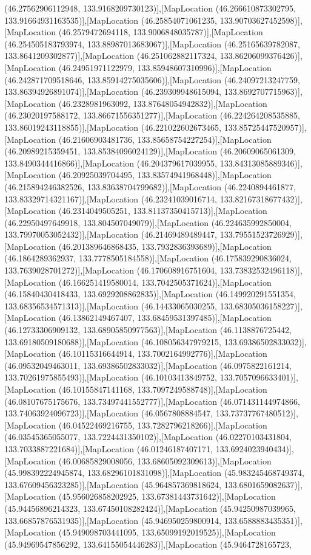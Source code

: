 (46.27562906112948, 133.9168209730123)],[MapLocation (46.266610873302795, 133.91664931163535)],[MapLocation (46.25854071061235, 133.90703627452598)],[MapLocation (46.2579472694118, 133.9006848035787)],[MapLocation (46.254505183793974, 133.88987013683067)],[MapLocation (46.25165639782087, 133.8641209302877)],[MapLocation (46.251062882117324, 133.86206099376426)],[MapLocation (46.24951971122979, 133.85948607310996)],[MapLocation (46.242871709518646, 133.85914275035606)],[MapLocation (46.24097213247759, 133.86394926891074)],[MapLocation (46.239309948615094, 133.8692707715963)],[MapLocation (46.2328981963092, 133.87648054942832)],[MapLocation (46.23020197588172, 133.86671556351277)],[MapLocation (46.224264208535885, 133.86019243118855)],[MapLocation (46.221022602673465, 133.85725447520957)],[MapLocation (46.21606903481736, 133.85658754227254)],[MapLocation (46.20989215359451, 133.85384096024129)],[MapLocation (46.20609065061309, 133.8490344416866)],[MapLocation (46.204379617039955, 133.84313085889346)],[MapLocation (46.20925039704495, 133.83574941968448)],[MapLocation (46.215894246382526, 133.83638704799682)],[MapLocation (46.2240894461877, 133.83329714321167)],[MapLocation (46.23241039016714, 133.82167318677432)],[MapLocation (46.2314049505251, 133.81137350415713)],[MapLocation (46.22950497649918, 133.804507049079)],[MapLocation (46.224635992850004, 133.79970053052432)],[MapLocation (46.21469489489447, 133.79551523726929)],[MapLocation (46.201389646868435, 133.7932836393689)],[MapLocation (46.1864289362937, 133.7778505184558)],[MapLocation (46.175839290836024, 133.7639028701272)],[MapLocation (46.170608916751604, 133.73832532496118)],[MapLocation (46.166251419580014, 133.7042505371624)],[MapLocation (46.15840430418433, 133.6929208862835)],[MapLocation (46.149920291551354, 133.68356534571313)],[MapLocation (46.14433065030255, 133.68305036158227)],[MapLocation (46.13862149467407, 133.68459531397485)],[MapLocation (46.12733306909132, 133.68905850977563)],[MapLocation (46.1138876725442, 133.69180509180688)],[MapLocation (46.108056347979215, 133.69386502833032)],[MapLocation (46.10115316644914, 133.7002164992776)],[MapLocation (46.09532049463011, 133.69386502833032)],[MapLocation (46.0975822161214, 133.70261975855493)],[MapLocation (46.10103413849752, 133.7057096633401)],[MapLocation (46.10155847141168, 133.7097249588748)],[MapLocation (46.08107675175676, 133.73497441552777)],[MapLocation (46.071431144974866, 133.74063924096723)],[MapLocation (46.0567808884547, 133.73737767480512)],[MapLocation (46.04522469216755, 133.7282796218266)],[MapLocation (46.03545365055077, 133.7224431350102)],[MapLocation (46.02270103431804, 133.7033887221684)],[MapLocation (46.01246187407171, 133.6924023940434)],[MapLocation (46.00685829008056, 133.68605092309613)],[MapLocation (45.998392224945874, 133.68296101831098)],[MapLocation (45.983245468749374, 133.67609456323285)],[MapLocation (45.964857369818624, 133.6801659082637)],[MapLocation (45.956026858202925, 133.67381443731642)],[MapLocation (45.94456896214323, 133.67450108282424)],[MapLocation (45.94250987039965, 133.66857876531935)],[MapLocation (45.946950259800914, 133.6588883435351)],[MapLocation (45.949098703441095, 133.65099192019525)],[MapLocation (45.94969547856292, 133.64155054446283)],[MapLocation (45.9464728165723, 